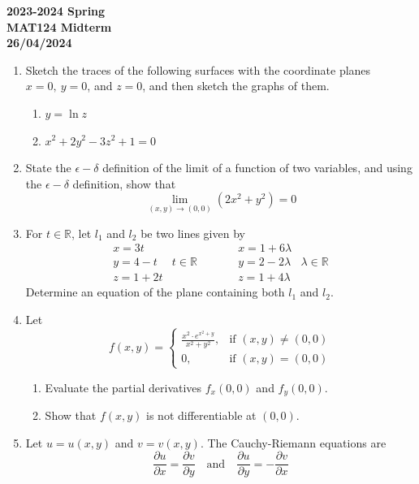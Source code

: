 \documentclass[a4paper, 12pt]{article}
\begin{document}
\pagestyle{empty}

\begin{center}
\textbf{2023-2024 Spring \\MAT124 Midterm\\26/04/2024}
\end{center}

\begin{enumerate}[leftmargin=*,label=\textbf{\arabic*.}]
\item Sketch the traces of the following surfaces with the coordinate planes $x=0,\:y=0$, and $z=0$, and then sketch the graphs of them.

\begin{enumerate}[leftmargin=*,label=\textbf{\alph*.}]
\item $y=\ln z$
\item $x^2+2y^2-3z^2+1=0$
\end{enumerate}

\item State the $\epsilon-\delta$ definition of the limit of a function of two variables, and using the $\epsilon-\delta$ definition, show that
\[\lim_{(x,y)\to(0,0)}\left(2x^2+y^2\right)=0\]

\item For $t\in\mathbb{R}$, let $l_1$ and $l_2$ be two lines given by
\[\begin{array}{ccccc}
x=3t&&&x=1+6\lambda&\\
y=4-t&t\in\mathbb{R}&& y=2-2\lambda&\lambda\in\mathbb{R}\\
z=1+2t&&\qquad&z=1+4\lambda&
\end{array}\]
Determine an equation of the plane containing both $l_1$ and $l_2$.

\item Let
\[f(x,y)=\left\{\begin{array}{cc}
\displaystyle\frac{x^2\cdot{e}^{x^2+y}}{x^2+y^2},&\text{if }(x,y)\neq(0,0)\\[1em]
0,&\text{if }(x,y)=(0,0)
\end{array}\right.\]

\begin{enumerate}[leftmargin=*,label=\textbf{\alph*.}]
\item Evaluate the partial derivatives $f_x(0,0)$ and $f_y(0,0)$.
\item Show that $f(x,y)$ is not differentiable at $(0,0)$.
\end{enumerate}

\item Let $u=u(x,y)$ and $v=v(x,y)$. The Cauchy-Riemann equations are
\[\frac{\partial u}{\partial x}=\frac{\partial v}{\partial y}\quad\text{and}\quad\frac{\partial u}{\partial y}=-\frac{\partial v}{\partial x}\]


\end{enumerate}
\end{document}
